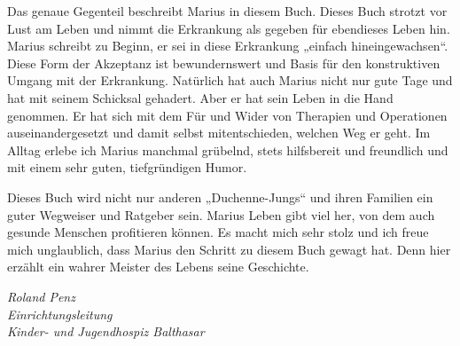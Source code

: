 \documentclass[fontsize=14pt,a4paper,headinclude,DIV=calc,automark]{scrbook}
\begin{document}
Das genaue Gegenteil beschreibt Marius in diesem Buch. Dieses Buch strotzt vor Lust am Leben und nimmt die Erkrankung als gegeben für ebendieses Leben hin. Marius schreibt zu Beginn, er sei in diese Erkrankung „einfach hineingewachsen“. Diese Form der Akzeptanz ist bewundernswert und Basis für den konstruktiven Umgang mit der Erkrankung. Natürlich hat auch Marius nicht nur gute Tage und hat mit seinem Schicksal gehadert. Aber er hat sein Leben in die Hand genommen. Er hat sich mit dem Für und Wider von Therapien und Operationen auseinandergesetzt und damit selbst mitentschieden, welchen Weg er geht. Im Alltag erlebe ich Marius manchmal grübelnd, stets hilfsbereit und freundlich und mit einem sehr guten, tiefgründigen Humor.

Dieses Buch wird nicht nur anderen „Duchenne-Jungs“ und ihren Familien ein guter Wegweiser und Ratgeber sein. Marius Leben gibt viel her, von dem auch gesunde Menschen profitieren können. Es macht mich sehr stolz und ich freue mich unglaublich, dass Marius den Schritt zu diesem Buch gewagt hat. Denn hier erzählt ein wahrer Meister des Lebens seine Geschichte.

\vspace{1.5\baselineskip}
\textit{Roland Penz} \\

\textit{Einrichtungsleitung} \\
\textit{Kinder- und Jugendhospiz Balthasar} \\
\end{document}
